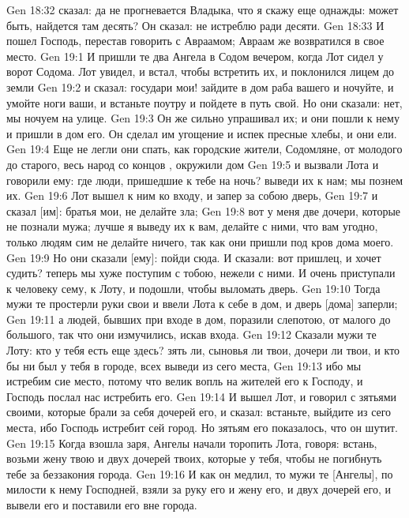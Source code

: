 \vs Gen 18:32  сказал: да не прогневается Владыка, что я скажу еще однажды: может быть, найдется там десять? Он сказал: не истреблю ради десяти.
\vs Gen 18:33 И пошел Господь, перестав говорить с Авраамом; Авраам же возвратился в свое место.
\vs Gen 19:1 И пришли те два Ангела в Содом вечером, когда Лот сидел у ворот Содома. Лот увидел, и встал, чтобы встретить их, и поклонился лицем до земли
\vs Gen 19:2 и сказал: государи мои! зайдите в дом раба вашего и ночуйте, и умойте ноги ваши, и встаньте поутру и пойдете в путь свой. Но они сказали: нет, мы ночуем на улице.
\vs Gen 19:3 Он же сильно упрашивал их; и они пошли к нему и пришли в дом его. Он сделал им угощение и испек пресные хлебы, и они ели.
\vs Gen 19:4 Еще не легли они спать, как городские жители, Содомляне, от молодого до старого, весь народ со  концов , окружили дом
\vs Gen 19:5 и вызвали Лота и говорили ему: где люди, пришедшие к тебе на ночь? выведи их к нам; мы познем их.
\vs Gen 19:6 Лот вышел к ним ко входу, и запер за собою дверь,
\vs Gen 19:7 и сказал [им]: братья мои, не делайте зла;
\vs Gen 19:8 вот у меня две дочери, которые не познали мужа; лучше я выведу их к вам, делайте с ними, что вам угодно, только людям сим не делайте ничего, так как они пришли под кров дома моего.
\vs Gen 19:9 Но они сказали [ему]: пойди сюда. И сказали: вот пришлец, и хочет судить? теперь мы хуже поступим с тобою, нежели с ними. И очень приступали к человеку сему, к Лоту, и подошли, чтобы выломать дверь.
\vs Gen 19:10 Тогда мужи те простерли руки свои и ввели Лота к себе в дом, и дверь [дома] заперли;
\vs Gen 19:11 а людей, бывших при входе в дом, поразили слепотою, от малого до большого, так что они измучились, искав входа.
\vs Gen 19:12 Сказали мужи те Лоту: кто у тебя есть еще здесь? зять ли, сыновья ли твои, дочери ли твои, и кто бы ни был у тебя в городе, всех выведи из сего места,
\vs Gen 19:13 ибо мы истребим сие место, потому что велик вопль на жителей его к Господу, и Господь послал нас истребить его.
\vs Gen 19:14 И вышел Лот, и говорил с зятьями своими, которые брали за себя дочерей его, и сказал: встаньте, выйдите из сего места, ибо Господь истребит сей город. Но зятьям его показалось, что он шутит.
\rsbpar\vs Gen 19:15 Когда взошла заря, Ангелы начали торопить Лота, говоря: встань, возьми жену твою и двух дочерей твоих, которые у тебя, чтобы не погибнуть тебе за беззакония города.
\vs Gen 19:16 И как он медлил, то мужи те [Ангелы], по милости к нему Господней, взяли за руку его и жену его, и двух дочерей его, и вывели его и поставили его вне города.
